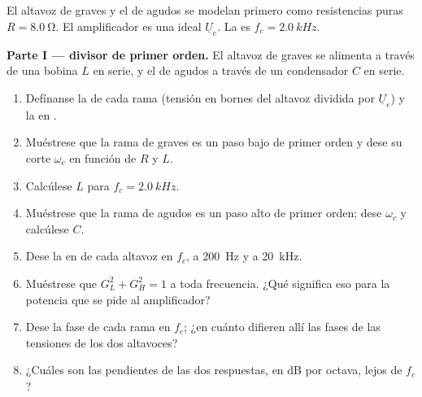 \begin{problem}
\label{pb:b1:filters-transfer-functions:1}
El altavoz de graves y el de agudos se modelan primero como resistencias
puras $R = \qty{8.0}{\ohm}$. El amplificador es una 
ideal $\underline U_e$. La  es $f_c = \qty{2.0}{kHz}$.

\medskip
\noindent\textbf{Parte I ---  divisor de primer orden.}
El altavoz de graves se alimenta a través de una bobina $L$ en serie, y el
de agudos a través de un condensador $C$ en serie.
\begin{enumerate}
  \item Defínanse la  de cada rama (tensión en
        bornes del altavoz dividida por $\underline U_e$) y la  en
        .
  \item Muéstrese que la rama de graves es un paso bajo de primer orden y
        dese su corte $\omega_c$ en función de $R$ y $L$.
  \item Calcúlese $L$ para $f_c = \qty{2.0}{kHz}$.
  \item Muéstrese que la rama de agudos es un paso alto de primer orden;
        dese $\omega_c$ y calcúlese $C$.
  \item Dese la  en  de cada altavoz en $f_c$, a
        \qty{200}{Hz} y a \qty{20}{kHz}.
  \item Muéstrese que $G_L^2 + G_H^2 = 1$ a toda frecuencia. ¿Qué
        significa eso para la potencia que se pide al amplificador?
  \item Dese la fase de cada rama en $f_c$; ¿en cuánto difieren allí las
        fases de las tensiones de los dos altavoces?
  \item ¿Cuáles son las pendientes de las dos respuestas, en dB por
        octava, lejos de $f_c$?
\end{enumerate}


\end{problem}
